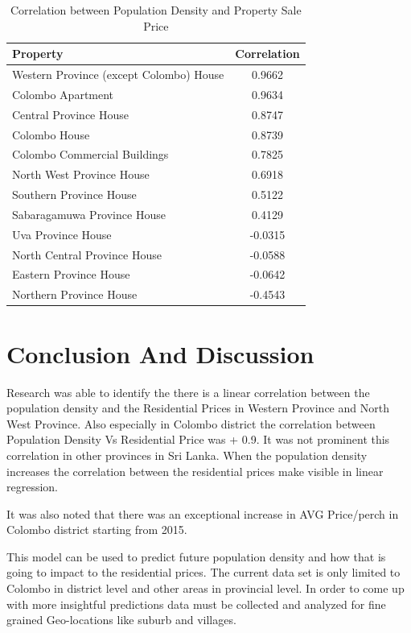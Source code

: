 \documentclass[conference]{IEEEtran}
\begin{document}
\begin{table}[h]
\caption{Correlation between Population Density and Property Sale Price}
\label{table_3}
\begin{center}
\begin{tabular}{|l|c|}
\hline
\textbf{Property} & \textbf{Correlation}\\
\hline
Western Province (except Colombo) House & 0.9662\\
\hline
Colombo Apartment & 0.9634\\
\hline
Central Province House & 0.8747\\
\hline
Colombo House & 0.8739\\
\hline
Colombo Commercial Buildings & 0.7825\\
\hline
North West Province House & 0.6918\\
\hline
Southern Province House & 0.5122\\
\hline
Sabaragamuwa Province House & 0.4129\\
\hline
Uva Province House & -0.0315\\
\hline
North Central Province House & -0.0588\\
\hline
Eastern Province House & -0.0642\\
\hline
Northern Province House & -0.4543\\
\hline
\end{tabular}
\end{center}
\end{table}


\section{Conclusion And Discussion}

Research was able to identify the there is a linear correlation between the population density and the Residential Prices in Western Province and North West Province. Also especially in Colombo district the correlation between Population Density Vs Residential Price was + 0.9. It was not prominent this correlation in other provinces in Sri Lanka. When the population density increases the correlation between the residential prices make visible in linear regression.

It was also noted that there was an exceptional increase in AVG Price/perch in Colombo district starting from 2015. 

This model can be used to predict future population density and how that is going to impact to the residential prices. The current data set is only limited to Colombo in district level and other areas in provincial level. In order to come up with more insightful predictions data must be collected and analyzed for fine grained Geo-locations  like suburb and villages.
\end{document}
